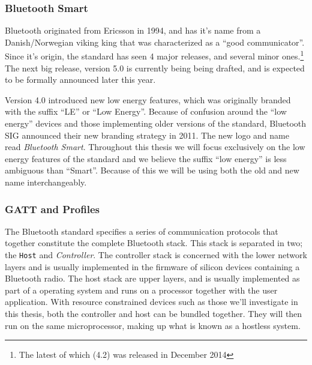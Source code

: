 \subsubsection{Bluetooth Smart} %
\label{ssub:bluetooth}

Bluetooth originated from Ericsson in 1994, and has it's name from a Danish/Norwegian viking king that was characterized as a ``good communicator''. Since it's origin, the standard has seen 4 major releases, and several minor ones.\footnote{ The latest of which (4.2) was released in December 2014} The next big release, version 5.0 is currently being being drafted, and is expected to be formally announced later this year. 

Version 4.0 introduced new low energy features, which was originally branded with the suffix ``LE'' or ``Low Energy''. Because of confusion around the ``low energy'' devices and those implementing older versions of the standard, Bluetooth SIG announced their new branding strategy in 2011. The new logo and name read \textit{Bluetooth Smart}. Throughout this thesis we will focus exclusively on the low energy features of the standard and we believe the suffix ``low energy'' is less ambiguous than ``Smart''. Because of this we will be using both the old and new name interchangeably.


\subsubsection{GATT and Profiles} %
\label{ssub:gatt_and_profiles}

The Bluetooth standard specifies a series of communication protocols that together constitute the complete Bluetooth stack. This stack is separated in two; the \texttt{Host} and \emph{Controller}. The controller stack is concerned with the lower network layers and is usually implemented in the firmware of silicon devices containing a Bluetooth radio. The host stack are upper layers, and is usually implemented as part of a operating system and runs on a processor together with the user application. With resource constrained devices such as those we'll investigate in this thesis, both the controller and host can be bundled together. They will then run on the same microprocessor,  making up what is known as a hostless system.


